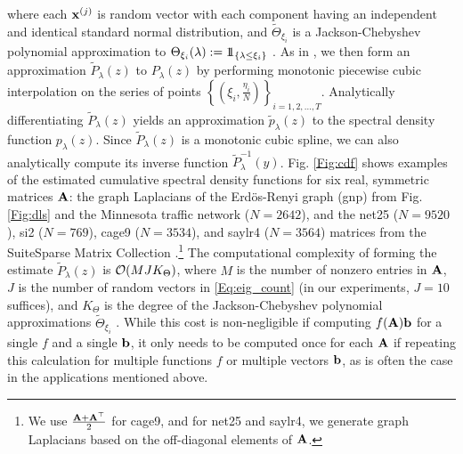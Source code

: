 \documentclass{article}
\begin{document}
where each ${\bf x}^{(j)}$ is random vector with each component having an independent and identical standard normal distribution, and $\tilde{\Theta}_{\xi_i}$ is a Jackson-Chebyshev polynomial approximation to $\Theta_{\xi_i}(\lambda):=1\!\!1_{\left\{\lambda \leq \xi_i\right\}}$ \cite{di2016efficient,puy_structured_sampling}. As in \cite{shuman2013spectrum}, we then form an approximation $\tilde{P}_{\lambda}(z)$ to $P_{\lambda}(z)$ by performing monotonic piecewise cubic interpolation \cite{fritsch} on the series of points $\left\{\left(\xi_i,\frac{\eta_i}{N}\right)\right\}_{i=1,2,\ldots,T}$. Analytically differentiating $\tilde{P}_{\lambda}(z)$ yields an approximation $\tilde{p}_{\lambda}(z)$ to the spectral density function $p_{\lambda}(z)$. Since $\tilde{P}_{\lambda}(z)$ is a monotonic cubic spline, we can also analytically compute its inverse function $\tilde{P}_{\lambda}^{-1}(y)$. Fig. \ref{Fig:cdf} shows examples of the estimated cumulative spectral density functions for six real, symmetric matrices ${\bf A}$: the graph Laplacians of the Erd\"{o}s-Renyi graph (gnp) from Fig. \ref{Fig:dls} and the Minnesota traffic network \cite{gleich} ($N=2642$), and the net25 ($N=9520$), si2 ($N=769$), cage9 ($N=3534$), and saylr4 ($N=3564$) matrices from the  SuiteSparse Matrix Collection \cite{suitesparse}.\footnote{We use $\frac{{\bf A}+{\bf A^{\top}}}{2}$ for cage9, and for net25 and saylr4, we generate graph Laplacians based on the off-diagonal elements of ${\bf A}$.}  The computational complexity of forming the estimate $\tilde{P}_{\lambda}(z)$ is ${\cal O}(MJK_{\Theta})$, where $M$ is the number of nonzero entries in ${\bf A}$, $J$ is the number of random vectors in \eqref{Eq:eig_count} (in our experiments, $J=10$ suffices), and $K_{\Theta}$ is the degree of the Jackson-Chebyshev polynomial approximations $\tilde{\Theta}_{\xi_i}$ \cite{mcsfb}. While this cost is non-negligible if computing $f({\bf A}){\bf b}$ for a single $f$ and a single ${\bf b}$, it only needs to be computed once for each ${\bf A}$ if repeating this calculation for multiple functions $f$ or multiple vectors ${\bf b}$, as is often the case in the applications mentioned above.
\end{document}

